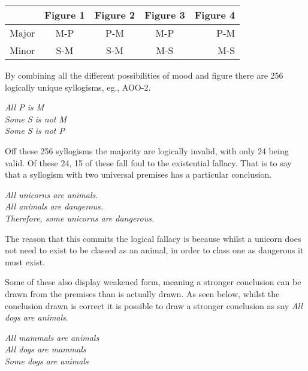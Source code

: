 \documentclass[12pt,a4paper]{report}
\newenvironment{tightcenter}{%
  \setlength\topsep{0pt}
  \setlength\parskip{0pt}
  \begin{center}
}{%
  \end{center}
}
\begin{document}
\begin{center}
  \begin{tabular}{ l | c | c | c | r }
     & Figure 1 & Figure 2 & Figure 3 & Figure 4 \\ \hline
    Major & M-P & P-M & M-P & P-M \\ \hline
    Minor & S-M & S-M & M-S & M-S \\
  \end{tabular}
\end{center}

By combining all the different possibilities of mood and figure there are 256 logically unique syllogisms, eg., AOO-2. 
\bigbreak
\begin{tightcenter}
\textit{All P is M}\\ 
\textit{Some S is not M}\\
\textit{Some S is not P}\\
\end{tightcenter}
\bigbreak

Off these 256 syllogisms the majority are logically invalid, with only 24 being valid. Of these 24, 15 of these fall foul to the existential fallacy. That is to say that a syllogism with two universal premises has a particular conclusion. 
\bigbreak
\begin{tightcenter}
\textit{All unicorns are animals.}\\ 
\textit{All animals are dangerous.}\\
\textit{Therefore, some unicorns are dangerous.}\\
\end{tightcenter}
\bigbreak

The reason that this commits the logical fallacy is because whilst a unicorn does not need to exist to be classed as an animal, in order to class one as dangerous it must exist.

Some of these also display weakened form, meaning a stronger conclusion can be drawn from the premises than is actually drawn. As seen below, whilst the conclusion drawn is correct it is possible to draw a stronger conclusion as say \textit{All dogs are animals}.

\bigbreak
\begin{tightcenter}
\textit{All mammals are animals}\\ 
\textit{All dogs are mammals}\\
\textit{Some dogs are animals }\\
\end{tightcenter}
\bigbreak
\end{document}
